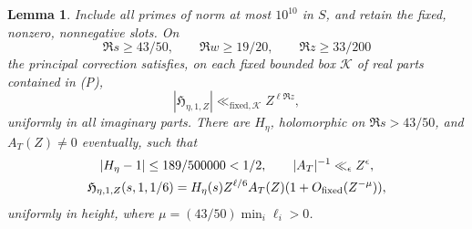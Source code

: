 \documentclass[12pt]{article}
\newtheorem{lemma}[theorem]{Lemma}
\begin{document}
\begin{lemma}\label{lem:principal-local}
Include all primes of norm at most \(10^{10}\) in \(S\), and
retain the fixed, nonzero, nonnegative slots.  On
\[
 \Re s\ge43/50,\qquad \Re w\ge19/20,\qquad \Re z\ge33/200
 \tag{P}\label{eq:Preg}
\]
the principal correction satisfies, on each fixed bounded
box \(\mathcal K\) of real parts contained in (P),
\[
 |\mathfrak H_{\eta,1,Z}|
       \ll_{\mathrm{fixed},\mathcal K} Z^{\ell\Re z},
\]
uniformly in all imaginary parts.
There are \(H_\eta\), holomorphic on \(\Re s>43/50\), and
\(A_T(Z)\ne0\) eventually, such that
\[
 \begin{gathered}
 |H_\eta-1|\le189/500000<1/2,\qquad |A_T|^{-1}\ll_\epsilon Z^\epsilon,\\
 \mathfrak H_{\eta,1,Z}(s,1,1/6)
 =H_\eta(s)Z^{\ell/6}A_T(Z)(1+O_{\rm fixed}(Z^{-\mu})),
 \end{gathered}
\]
uniformly in height, where \(\mu=(43/50)\min_i\ell_i>0\).
\end{lemma}
\end{document}
